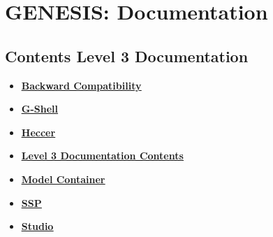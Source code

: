 \documentclass[12pt]{article}
\begin{document}
\section*{GENESIS: Documentation}

\subsection*{Contents Level 3 Documentation}

\begin{itemize}

\item \href{../tests-g2-backward-compatibility/tests-g2-backward-compatibility.pdf}{\bf \underline{Backward Compatibility}}

\item \href{../tests-gshell/tests-gshell.pdf}{\bf \underline{G-Shell}}

\item \href{../tests-heccer/tests-heccer.pdf}{\bf \underline{Heccer}}

\item \href{../contents-level3/contents-level3.pdf}{\bf \underline{Level 3 Documentation Contents}}

\item \href{../tests-model-container/tests-model-container.pdf}{\bf \underline{Model Container}}

\item \href{../tests-ssp/tests-ssp.pdf}{\bf \underline{SSP}}

\item \href{../tests-studio/tests-studio.pdf}{\bf \underline{Studio}}


\end{itemize}

\end{document}
